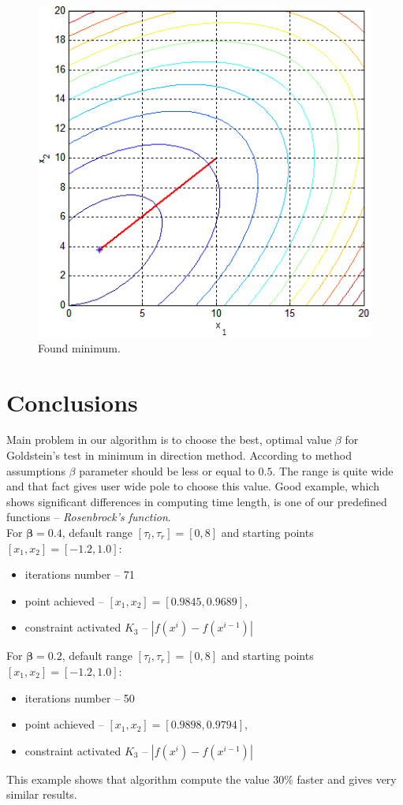 \documentclass[12pt]{article}
\begin{document}
\begin{figure}[H]
	\begin{center}
		\includegraphics[width=16cm]{spirngs_results.png}
		\caption{Found minimum.}
	\end{center}
\end{figure}	

\section{Conclusions}
Main problem in our algorithm is to choose the best, optimal value $\beta$ for Goldstein's test in minimum in direction method. According to method assumptions $\beta$ parameter should be less or equal to $0.5$. The range is quite wide and that fact gives user wide pole to choose this value. Good example, which shows significant differences in computing time length, is one of our predefined functions -- \textit{Rosenbrock's function}. \\
For $\bm{\beta=0.4}$, default range $[\tau_l ,\tau_r]=[0, 8]$ and starting points $[x_1 ,x_2]=[-1.2, 1.0]$:
\begin{itemize}
\item iterations number -- 71
\item point achieved  -- $[x_1, x_2]=[0.9845, 0.9689]$,
\item constraint activated $K_3$ --  $|f(x^i)-f(x^{i-1})|$
\end{itemize}
For $\bm{\beta=0.2}$, default range $[\tau_l, \tau_r]=[0, 8]$ and starting points $[x_1, x_2]=[-1.2, 1.0]$:
\begin{itemize}
\item iterations number -- 50
\item point achieved  -- $[x_1, x_2]=[0.9898, 0.9794]$,
\item constraint activated $K_3$ --  $|f(x^i)-f(x^{i-1})|$
\end{itemize}
This example shows that algorithm compute the value $30\%$ faster and gives very similar results.  
\end{document}
